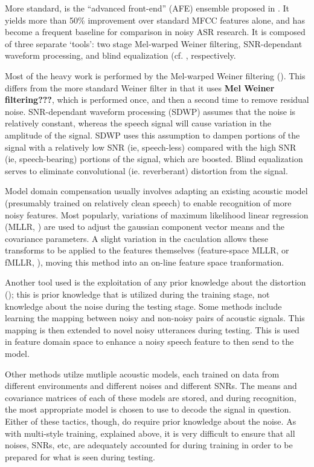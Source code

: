 \documentclass[dissertation,copyright]{uathesis}
\begin{document}
More standard, is the ``advanced front-end'' (AFE) ensemble proposed in \cite{etsi:02}.  It yields more than 50\% improvement over standard MFCC features alone, and has become a frequent baseline for comparison in noisy ASR research.  It is composed of three separate `tools': two stage Mel-warped Weiner filtering, SNR-dependant waveform processing, and blind equalization (cf. \cite{argawal:99,macho:02;macho:01;mauuary:98}, respectively.



Most of the heavy work is performed by the Mel-warped Weiner filtering (\cite{li:14}).  This differs from the more standard Weiner filter in that it uses \textbf{Mel Weiner filtering???}, which is performed once, and then a second time to remove residual noise.  SNR-dependant waveform processing (SDWP) assumes that the noise is relatively constant, whereas the speech signal will cause variation in the amplitude of the signal.  SDWP uses this assumption to dampen portions of the signal with a relatively low SNR (ie, speech-less) compared with the high SNR (ie, speech-bearing) portions of the signal, which are boosted.  Blind equalization serves to eliminate convolutional (ie. reverberant) distortion from the signal.

Model domain compensation usually involves adapting an existing acoustic model (presumably trained on relatively clean speech) to enable recognition of more noisy features.  Most popularly, variations of maximum likelihood linear regression (MLLR, \cite{leggetter:95}) are used to adjust the gaussian component vector means and the covariance parameters.  A slight variation in the caculation allows these transforms to be applied to the features themselves (feature-space MLLR, or fMLLR, \cite{gales:98}), moving this method into an on-line feature space tranformation.



Another tool used is the exploitation of any prior knowledge about the distortion (\cite{li:14}); this is prior knowledge that is utilized during the training stage, not knowledge about the noise during the testing stage.  Some methods include learning the mapping between noisy and non-noisy pairs of acoustic signals.  This mapping is then extended to novel noisy utterances during testing.  This is used in feature domain space to enhance a noisy speech feature to then send to the model.  

Other methods utilze mutliple acoustic models, each trained on data from different environments and different noises and different SNRs.  The means and covariance matrices of each of these models are stored, and during recognition, the most appropriate model is chosen to use to decode the signal in question.  Either of these tactics, though, do require prior knowledge about the noise.  As with multi-style training, explained above, it is very difficult to ensure that all noises, SNRs, etc, are adequately accounted for during training in order to be prepared for what is seen during testing.
\end{document}
